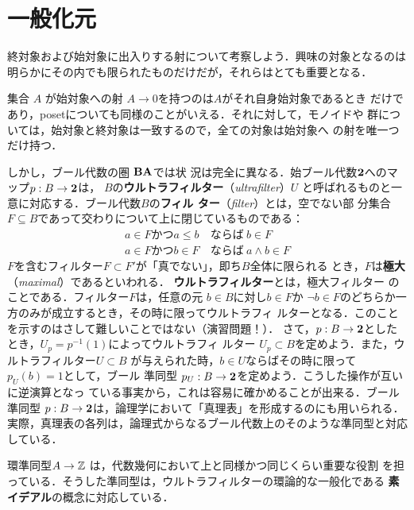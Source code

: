 
\section{一般化元}
終対象および始対象に出入りする射について考察しよう．興味の対象となるのは
明らかにその内でも限られたものだけだが，それらはとても重要となる．

集合 $A$ が始対象への射 $A \to 0$を持つのは$A$がそれ自身始対象であるとき
だけであり，posetについても同様のことがいえる．それに対して，モノイドや
群については，始対象と終対象は一致するので，全ての対象は始対象へ
の射を唯一つだけ持つ．

しかし，ブール代数の圏 ${\bf BA}$では状
況は完全に異なる．始ブール代数${\bf 2}$へのマップ$p: B \to {\bf 2}$は，
$B$の{\bfseries ウルトラフィルター}（{\itshape ultrafilter}）$U$
と呼ばれるものと一意に対応する．ブール代数$B$の{\bfseries フィル
ター}（{\itshape filter}）とは，空でない部
分集合$F \subseteq B$であって交わりについて上に閉じているものである：
\begin{align*}
 a \in F \text{かつ} a \leq b\  &\text{ならば} \ b \in F\\
 a \in F \text{かつ} b \in F\  &\text{ならば} \ a \wedge b \in F
\end{align*}
$F$を含むフィルター$F \subset F'$が「真でない」，即ち$B$全体に限られる
とき，$F$は{\bfseries 極大}（{\itshape maximal}）であるといわれる．
{\bfseries ウルトラフィルター}とは，極大フィルター
の
ことである．フィルター$F$は，任意の元 $b \in B$に対し$b \in F$か
$\neg b \in F$のどちらか一方のみが成立するとき，その時に限ってウルトラフィ
ルターとなる．このことを示すのはさして難しいことではない（演習問題！）．
さて，$p: B \to {\bf 2}$としたとき，$U_p = p^{-1}(1)$によってウルトラフィ
ルター $U_p \subset B$を定めよう．また，ウルトラフィルター$U \subset B$
が与えられた時，$b \in U$ならばその時に限って$p_U(b) = 1$として，ブール
準同型 $p_U: B \to {\bf 2}$を定めよう．こうした操作が互いに逆演算となっ
ている事実から，これは容易に確かめることが出来る．ブール準同型
$p: B \to {\bf 2}$は，論理学において「真理表」を形成するのにも用いられる．
実際，真理表の各列は，論理式からなるブール代数上のそのような準同型と対応
している．

環準同型$A \to \mathbb{Z}$ は，代数幾何において上と同様かつ同じくらい重要な役割
を担っている．そうした準同型は，ウルトラフィルターの環論的な一般化である
{\bfseries 素イデアル}の概念に対応している．

